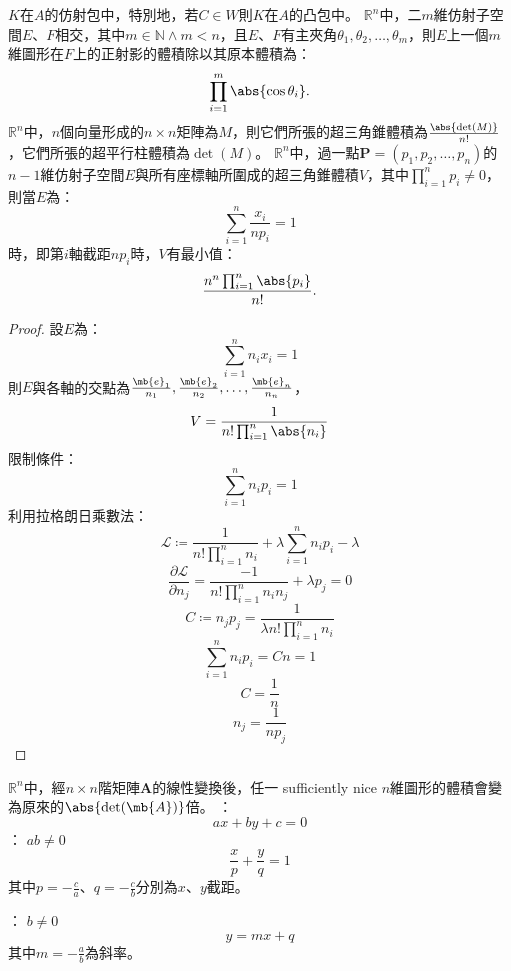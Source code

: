 \documentclass[a4paper,12pt]{report}
\begin{document}
$K$在$A$的仿射包中，特別地，若$C\in W$則$K$在$A$的凸包中。
$\mathbb{R}^n$中，二$m$維仿射子空間$E$、$F$相交，其中$m\in\mathbb{N}\land m<n$，且$E$、$F$有主夾角$\theta_1,\theta_2,\ldots,\theta_m$，則$E$上一個$m$維圖形在$F$上的正射影的體積除以其原本體積為：
\[\prod_{i=1}^{m}\abs{\cos\theta_i}.\]
$\mathbb{R}^n$中，$n$個向量形成的$n\times n$矩陣為$M$，則它們所張的超三角錐體積為$\frac{\abs{\det(M)}}{n!}$，它們所張的超平行柱體積為$\det(M)$。
$\mathbb{R}^n$中，過一點$\mathbf{P}=(p_1,p_2,\ldots,p_n)$的$n-1$維仿射子空間$E$與所有座標軸所圍成的超三角錐體積$V$，其中$\prod_{i=1}^np_i\neq 0$，則當$E$為：
\[\sum_{i=1}^n\frac{x_i}{np_i}=1\]
時，即第$i$軸截距$np_i$時，$V$有最小值：
\[\frac{n^n\prod_{i=1}^n\abs{p_i}}{n!}.\]
\begin{proof}
設$E$為：
\[\sum_{i=1}^nn_ix_i=1\]
則$E$與各軸的交點為$\frac{\mb{e}_1}{n_1},\frac{\mb{e}_2}{n_2},\ldots,\frac{\mb{e}_n}{n_n}$，
\[V=\frac{1}{n!\prod_{i=1}^n\abs{n_i}}\]
限制條件：
\[\sum_{i=1}^nn_ip_i=1\]
利用拉格朗日乘數法：
\[\mathcal{L}\coloneq\frac{1}{n!\prod_{i=1}^nn_i}+\lambda\sum_{i=1}^nn_ip_i-\lambda\]
\[\frac{\partial\mathcal{L}}{\partial n_j}=\frac{-1}{n!\prod_{i=1}^nn_in_j}+\lambda p_j=0\]
\[C\coloneq n_jp_j=\frac{1}{\lambda  n!\prod_{i=1}^nn_i}\]
\[\sum_{i=1}^nn_ip_i=Cn=1\]
\[C=\frac{1}{n}\]
\[n_j=\frac{1}{np_j}\]
\end{proof}
$\mathbb{R}^n$中，經$n\times n$階矩陣$\mathbf{A}$的線性變換後，任一 sufficiently nice $n$維圖形的體積會變為原來的$\abs{\det(\mb{A})}$倍。
：
\[ax+by+c=0\]
：
$ab\neq 0$
\[\frac{x}{p}+\frac{y}{q}=1\]
其中$p=-\frac{c}{a}$、$q=-\frac{c}{b}$分別為$x$、$y$截距。

：
$b\neq 0$
\[y=mx+q\]
其中$m=-\frac{a}{b}$為斜率。
\end{document}
